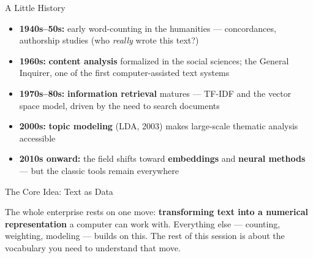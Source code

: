 \documentclass[aspectratio=169]{beamer}
\begin{document}
\begin{frame}{A Little History}
\vspace{0.3cm}
\begin{itemize}\setlength\itemsep{9pt}
  \item[\textcolor{wurgreen}{\faHistory}]
    \textbf{1940s--50s:} early word-counting in the humanities ---
    concordances, authorship studies (who \textit{really} wrote this text?)
  \item[\textcolor{wurgreen}{\faHistory}]
    \textbf{1960s:} \textbf{content analysis} formalized in the social sciences;
    the General Inquirer, one of the first computer-assisted text systems
  \item[\textcolor{wurgreen}{\faHistory}]
    \textbf{1970s--80s:} \textbf{information retrieval} matures ---
    TF-IDF and the vector space model, driven by the need to search documents
  \item[\textcolor{wurgreen}{\faHistory}]
    \textbf{2000s:} \textbf{topic modeling} (LDA, 2003) makes large-scale
    thematic analysis accessible
  \item[\textcolor{wurgreen}{\faHistory}]
    \textbf{2010s onward:} the field shifts toward \textbf{embeddings} and
    \textbf{neural methods} --- but the classic tools remain everywhere
\end{itemize}
\end{frame}

\begin{frame}{The Core Idea: Text as Data}
\vspace{0.4cm}
\begin{center}
\end{center}

\bigskip
{\small The whole enterprise rests on one move: \textbf{transforming text into a
numerical representation} a computer can work with. Everything else --- counting,
weighting, modeling --- builds on this. The rest of this session is about the
vocabulary you need to understand that move.}
\end{frame}
\end{document}
